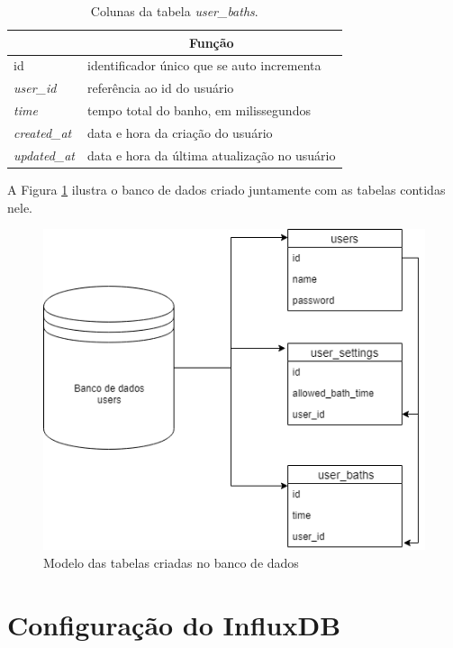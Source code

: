 \begin{table}[]
	\centering
	\begin{tabular}{|l|l|}
		\hline
		\rowcolor[HTML]{ECF4FF} 
		\multicolumn{1}{|c|}{\cellcolor[HTML]{ECF4FF}Coluna} & \multicolumn{1}{c|}{\cellcolor[HTML]{ECF4FF}Função} \\ \hline
		id                                                   & identificador único que se auto incrementa          \\ \hline
		\textit{user\_id}                                    & referência ao id do usuário                         \\ \hline
		\textit{time}                                        & tempo total do banho, em milissegundos              \\ \hline
		\textit{created\_at}                                 & data e hora da criação do usuário                   \\ \hline
		\textit{updated\_at}                                 & data e hora da última atualização no usuário        \\ \hline
	\end{tabular}
	\caption{Colunas da tabela \textit{user\_baths}.}
	\label{tab:user-baths}
\end{table}

A Figura \ref{fig:modeltables} ilustra o banco de dados criado juntamente com as tabelas contidas nele.

\begin{figure}[htbp]
	\centering
	\includegraphics[width=0.6\linewidth]{figuras/postgrediagram.png}
	\caption{Modelo das tabelas criadas no banco de dados}
	\label{fig:modeltables}
\end{figure}

\newpage

\section{Configuração do InfluxDB}


